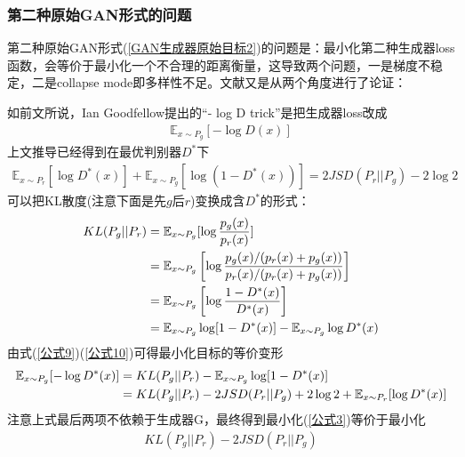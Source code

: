         \subsubsection{第二种原始GAN形式的问题}
            \par
            第二种原始GAN形式(\ref{GAN生成器原始目标2})的问题是：最小化第二种生成器loss函数，会等价于最小化一个不合理的距离衡量，这导致两个问题，一是梯度不稳定，二是collapse mode即多样性不足。文献\cite{2017.Arjovsky}又是从两个角度进行了论证：
            \par
            如前文所说，Ian Goodfellow提出的“- log D trick”是把生成器loss改成
            \begin{align}
            \label{公式3}
            \mathbb{E}_{x\sim P_g}[-\log D(x)]
            \end{align}
            上文推导已经得到在最优判别器$D^*$下
            \begin{align}
            \label{公式9}
            \mathbb{E}_{x\sim P_r}[\log D^*(x)] + \mathbb{E}_{x\sim P_g}[\log(1-D^*(x))] = 2JSD(P_r || P_g) - 2\log 2
            \end{align}
            可以把KL散度(注意下面是先$g$后$r$)变换成含$D^*$的形式：
            \begin{align}
            \label{公式10}
            KL(P_g || P_r) &= \mathbb{E}_{x \sim P_g} [\log \frac{p_g(x)}{p_r(x)}] \notag\\
            &= \mathbb{E}_{x \sim P_g} \left[\log \frac{p_g(x) / (p_r(x) + p_g(x))}{p_r(x) / (p_r(x) + p_g(x))}\right] \notag\\
            &= \mathbb{E}_{x \sim P_g} \left[\log \frac{1 - D^*(x)}{D^*(x)}\right] \notag\\
            &= \mathbb{E}_{x \sim P_g} \log [1 - D^*(x)] - \mathbb{E}_{x \sim P_g} \log D^*(x)
            \end{align}
            由式(\ref{公式9})(\ref{公式10})可得最小化目标的等价变形
            \begin{align}
            \mathbb{E}_{x \sim P_g} [-\log D^*(x)] &= KL(P_g || P_r) - \mathbb{E}_{x \sim P_g} \log [1 - D^*(x)] \notag \\ &= KL(P_g || P_r) - 2JSD(P_r || P_g) + 2\log 2 + \mathbb{E}_{x\sim P_r}[\log D^*(x)]
            \end{align}
            注意上式最后两项不依赖于生成器G，最终得到最小化(\ref{公式3})等价于最小化
            \begin{align}
            \label{公式11}
            KL(P_g || P_r) - 2JSD(P_r || P_g)
            \end{align}
